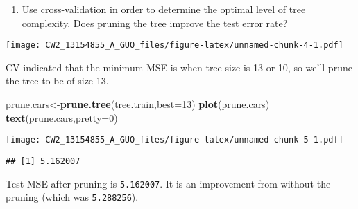 \documentclass[]{article}
\newenvironment{Shaded}{\begin{snugshade}}{\end{snugshade}}
\newcommand{\KeywordTok}[1]{\textcolor[rgb]{0.13,0.29,0.53}{\textbf{#1}}}
\newcommand{\DataTypeTok}[1]{\textcolor[rgb]{0.13,0.29,0.53}{#1}}
\newcommand{\DecValTok}[1]{\textcolor[rgb]{0.00,0.00,0.81}{#1}}
\newcommand{\StringTok}[1]{\textcolor[rgb]{0.31,0.60,0.02}{#1}}
\newcommand{\OperatorTok}[1]{\textcolor[rgb]{0.81,0.36,0.00}{\textbf{#1}}}
\newcommand{\NormalTok}[1]{#1}
\providecommand{\tightlist}{%
  \setlength{\itemsep}{0pt}\setlength{\parskip}{0pt}}
\begin{document}
\begin{enumerate}
\def\labelenumi{(\alph{enumi})}
\setcounter{enumi}{2}
\tightlist
\item
  Use cross-validation in order to determine the optimal level of tree
  complexity. Does pruning the tree improve the test error rate?
\end{enumerate}

\begin{Shaded}
\end{Shaded}

\texttt{[image: CW2\_13154855\_A\_GUO\_files/figure-latex/unnamed-chunk-4-1.pdf]}

CV indicated that the minimum MSE is when tree size is 13 or 10, so
we'll prune the tree to be of size 13.

\begin{Shaded}
\begin{Highlighting}[]
\NormalTok{prune.cars<-}\KeywordTok{prune.tree}\NormalTok{(tree.train,}\DataTypeTok{best=}\DecValTok{13}\NormalTok{)}
\KeywordTok{plot}\NormalTok{(prune.cars)}
\KeywordTok{text}\NormalTok{(prune.cars,}\DataTypeTok{pretty=}\DecValTok{0}\NormalTok{)}
\end{Highlighting}
\end{Shaded}

\texttt{[image: CW2\_13154855\_A\_GUO\_files/figure-latex/unnamed-chunk-5-1.pdf]}

\begin{Shaded}
\end{Shaded}

\begin{verbatim}
## [1] 5.162007
\end{verbatim}

Test MSE after pruning is \texttt{5.162007}. It is an improvement from
without the pruning (which was \texttt{5.288256}).
\end{document}
